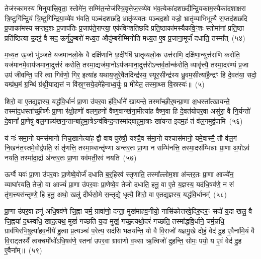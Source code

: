 तेज॑स्कामस्य मिनुयात्त्रि॒वृता॒ स्तोमे॑न॒ सम्मि॑त॒न्तेज॑स्त्रि॒वृत्ते॑ज॒स्व्ये॑व भ॑व॒त्येका॑\-दशछदीन्द्रि॒यका॑म॒स्यैका॑\-दशाक्षरा त्रि॒ष्टुगि॑न्द्रि॒यं त्रि॒ष्टुगि॑न्द्रिया॒व्ये॑व भ॑वति॒ पञ्च॑दशछदि॒ भ्रातृ॑व्यवतः पञ्चद॒शो वज्रो॒ भ्रातृ॑व्याभिभूत्यै स॒प्तद॑शछदि प्र॒जाका॑मस्य सप्तद॒शः प्र॒जा\-प॑तिः प्र॒जाप॑ते॒राप्त्या॒ एक॑विꣳशतिछदि प्रति॒ष्ठाका॑मस्यैकवि॒ꣳ॒शः स्तोमा॑नां प्रति॒ष्ठा प्रति॑ष्ठित्या उ॒दरं॒ वै सद॒ ऊर्गु॑दु॒म्बरो॑ मध्य॒त औदु॑म्बरीम्मिनोति मध्य॒त ए॒व प्र॒जाना॒मूर्जं॑ दधाति॒ तस्मा᳚त्~(५४)

म॒ध्य॒त ऊ॒र्जा भु॑ञ्जते यजमानलो॒के वै दक्षि॑णानि छ॒दीꣳषि॑ भ्रातृव्यलो॒क उत्त॑राणि॒ दक्षि॑णा॒न्युत्त॑राणि करोति॒ यज॑मानमे॒वाय॑जमाना॒दुत्त॑रं करोति॒ तस्मा॒द्यज॑मा॒नो\-ऽय॑जमाना॒दुत्त॑रो\-ऽन्तर्व॒र्तान्क॑रोति॒ व्यावृ॑त्त्यै॒ तस्मा॒दर॑ण्यं प्र॒जा उप॑ जीवन्ति॒ परि॑ त्वा गिर्वणो॒ गिर॒ इत्या॑ह यथाय॒जुरे॒वैतदिन्द्र॑स्य॒ स्यूर॒सीन्द्र॑स्य ध्रु॒वम॒सीत्या॑है॒न्द्रꣳ हि दे॒वत॑या॒ सदो॒ यम्प्र॑थ॒मं ग्र॒न्थिं ग्र॑थ्नी॒याद्यत्तं न वि॑स्र॒ꣳ॒सये॒दमे॑हेनाध्व॒र्युः प्र मी॑येत॒ तस्मा॒थ्स वि॒स्रस्यः॑॥~(५)

{\anuvakamend[{अप॑हत्यै॒ तस्मा᳚त्पितृदेव॒त्य॑न्तेनै॒व नव॑छदि॒ तस्मा॒थ्सदः॒ पञ्च॑दश च}]}%

शिरो॒ वा ए॒तद्य॒ज्ञस्य॒ यद्ध॑वि॒र्धानं॑ प्रा॒णा उ॑पर॒वा ह॑वि॒र्धाने॑ खायन्ते॒ तस्मा᳚च्छी॒र्॒\mbox{}षन्प्रा॒णा अ॒धस्ता᳚त्खायन्ते॒ तस्मा॑द॒धस्ता᳚च्छी॒र्ष्णः प्रा॒णा र॑क्षो॒हणो॑ वलग॒हनो॑ वैष्ण॒वान्ख॑ना॒मीत्या॑ह वैष्ण॒वा हि दे॒वत॑योपर॒वा असु॑रा॒ वै नि॒र्यन्तो॑ दे॒वानां᳚ प्रा॒णेषु॑ वल॒गान्न्य॑खन॒न्तान्बा॑हुमा॒त्रे\-ऽन्व॑विन्द॒न्तस्मा᳚द्बाहुमा॒त्राः खा॑यन्त इ॒दम॒हं तं व॑ल॒गमुद्व॑पामि~(५६)

यं नः॑ समा॒नो यमस॑मानो निच॒खानेत्या॑ह॒ द्वौ वाव पुरु॑षौ॒ यश्चै॒व स॑मा॒नो यश्चास॑मानो॒ यमे॒वास्मै॒ तौ व॑ल॒गं नि॒खन॑त॒स्तमे॒वोद्व॑पति॒ सं तृ॑णत्ति॒ तस्मा॒थ्सन्तृ॑ण्णा अन्तर॒तः प्रा॒णा न सम्भि॑नत्ति॒ तस्मा॒दस॑म्भिन्नाः प्रा॒णा अ॒पो\-ऽव॑ नयति॒ तस्मा॑दा॒र्द्रा अ॑न्तर॒तः प्रा॒णा यव॑मती॒रव॑ नयति~(५७)

ऊर्ग्वै यवः॑ प्रा॒णा उ॑पर॒वाः प्रा॒णेष्वे॒वोर्जं॑ दधाति ब॒र्॒\mbox{}हिरव॑ स्तृणाति॒ तस्मा᳚ल्लोम॒शा अ॑न्तर॒तः प्रा॒णा आज्ये॑न॒ व्याघा॑रयति॒ तेजो॒ वा आज्यं॑ प्रा॒णा उ॑पर॒वाः प्रा॒णेष्वे॒व तेजो॑ दधाति॒ हनू॒ वा ए॒ते य॒ज्ञस्य॒ यद॑धि॒षव॑णे॒ न सं तृ॑ण॒त्त्यस॑न्तृण्णे॒ हि हनू॒ अथो॒ खलु॑ दीर्घसो॒मे स॒न्तृद्ये॒ धृत्यै॒ शिरो॒ वा ए॒तद्य॒ज्ञस्य॒ यद्ध॑वि॒र्धानम्᳚~(५८)

प्रा॒णा उ॑पर॒वा हनू॑ अधि॒षव॑णे जि॒ह्वा चर्म॒ ग्रावा॑णो॒ दन्ता॒ मुख॑माहव॒नीयो॒ नासि॑कोत्तरवे॒दिरु॒दर॒ꣳ॒ सदो॑ य॒दा खलु॒ वै जि॒ह्वया॑ द॒थ्स्वधि॒ खाद॒त्यथ॒ मुखं॑ गच्छति य॒दा मुखं॒ गच्छ॒त्यथो॒दरं॑ गच्छति॒ तस्मा᳚द्धवि॒र्धाने॒ चर्म॒न्नधि॒ ग्राव॑भिरभि॒षुत्या॑हव॒नीये॑ हु॒त्वा प्र॒त्यञ्चः॑ प॒रेत्य॒ सद॑सि भक्षयन्ति॒ यो वै वि॒राजो॑ यज्ञमु॒खे दोहं॒ वेद॑ दु॒ह ए॒वैना॑मि॒यं वै वि॒राट्तस्यैँ त्वक्चर्मोधो॑\-ऽधि॒षव॑णे॒ स्तना॑ उपर॒वा ग्रावा॑णो व॒थ्सा ऋ॒त्विजो॑ दुहन्ति॒ सोमः॒ पयो॒ य ए॒वं वेद॑ दु॒ह ए॒वैना᳚म्॥~(५९)

